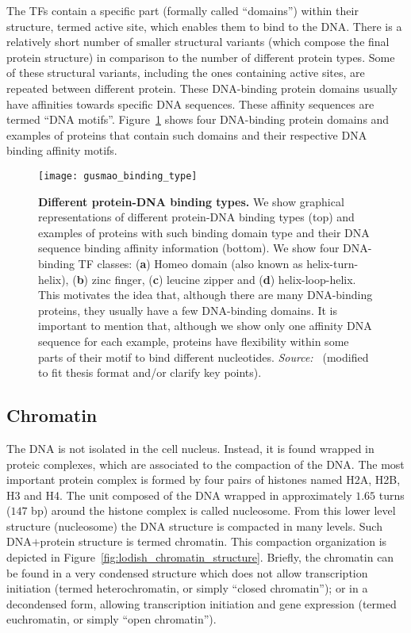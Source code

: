 The TFs contain a specific part (formally called ``domains'') within their structure, termed active site, which enables them to bind to the DNA. There is a relatively short number of smaller structural variants (which compose the final protein structure) in comparison to the number of different protein types. Some of these structural variants, including the ones containing active sites, are repeated between different protein. These DNA-binding protein domains usually have affinities towards specific DNA sequences. These affinity sequences are termed ``DNA motifs''. Figure~\ref{fig:gusmao_binding_type} shows four DNA-binding protein domains and examples of proteins that contain such domains and their respective DNA binding affinity motifs.

\begin{figure}[h!]
\centering
\texttt{[image: gusmao\_binding\_type]}
\caption[Different protein-DNA binding types]{\textbf{Different protein-DNA binding types.} We show graphical representations of different protein-DNA binding types (top) and examples of proteins with such binding domain type and their DNA sequence binding affinity information (bottom). We show four DNA-binding TF classes: (\textbf{a}) Homeo domain (also known as helix-turn-helix), (\textbf{b}) zinc finger, (\textbf{c}) leucine zipper and (\textbf{d}) helix-loop-helix. This motivates the idea that, although there are many DNA-binding proteins, they usually have a few DNA-binding domains. It is important to mention that, although we show only one affinity DNA sequence for each example, proteins have flexibility within some parts of their motif to bind different nucleotides. \emph{Source:~\cite{alberts2007}} (modified to fit thesis format and/or clarify key points).}
\label{fig:gusmao_binding_type}
\end{figure}

\subsection{Chromatin}
\label{sec:chromatin}

The DNA is not isolated in the cell nucleus. Instead, it is found wrapped in proteic complexes, which are associated to the compaction of the DNA. The most important protein complex is formed by four pairs of histones named H2A, H2B, H3 and H4. The unit composed of the DNA wrapped in approximately $1.65$ turns (\approxy$147$ bp) around the histone complex is called nucleosome. From this lower level structure (nucleosome) the DNA structure is compacted in many levels. Such DNA$+$protein structure is termed chromatin. This compaction organization is depicted in Figure~\ref{fig:lodish_chromatin_structure}. Briefly, the chromatin can be found in a very condensed structure which does not allow transcription initiation (termed heterochromatin, or simply ``closed chromatin''); or in a decondensed form, allowing transcription initiation and gene expression (termed euchromatin, or simply ``open chromatin'').

